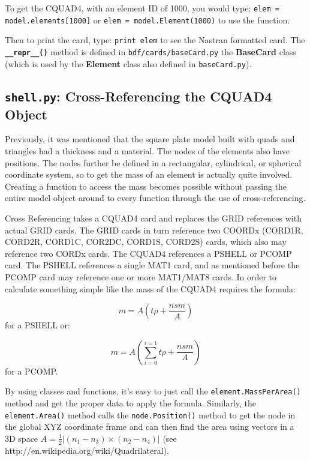      To get the CQUAD4, with an element ID of 1000, you would type:
       {\tt elem = model.elements[1000]} or
       {\tt elem = model.Element(1000)} to use the function.
     
     Then to print the card, type:
       {\tt print elem}
     to see the Nastran formatted card.  The {\bf \tt \_\_repr\_\_()} method is defined in {\tt bdf/cards/baseCard.py} the {\bf BaseCard} class (which is used by the {\bf Element} class also defined in {\tt baseCard.py}).

 \subsection{{\tt shell.py}: Cross-Referencing the CQUAD4 Object}
     Previously, it was mentioned that the square plate model built with quads and triangles had a thickness and a material.  The nodes of the elements also have positions.  The nodes further be defined in a rectangular, cylindrical, or spherical coordinate system, so to get the mass of an element is actually quite involved.  Creating a function to access the mass becomes possible without passing the entire model object around to every function through the use of cross-referencing.
     
     Cross Referencing takes a CQUAD4 card and replaces the GRID references with actual GRID cards.  The GRID cards in turn reference two COORDx (CORD1R, CORD2R, CORD1C, COR2DC, CORD1S, CORD2S) cards, which also may reference two CORDx cards.  The CQUAD4 references a PSHELL or PCOMP card.  The PSHELL references a single MAT1 card, and as mentioned before the PCOMP card may reference one or more MAT1/MAT8 cards.  In order to calculate something simple like the mass of the CQUAD4 requires the formula:
     
     {\begin{equation} m=A ( t\rho + \frac{nsm}{A} ) \end{equation} } for a PSHELL or:

     {\begin{equation} m=A (\sum_{i=0}^{i=1}{t\rho} + \frac{nsm}{A} )  \end{equation} } for a PCOMP.
     

     By using classes and functions, it's easy to just call the {\tt element.MassPerArea()} method and get the proper data to apply the formula.  Similarly, the {\tt element.Area()} method calls the {\tt node.Position()} method to get the node in the global XYZ coordinate frame and can then find the area using vectors in a 3D space
     $ A=\frac{1}{2} | (n_1-n_3) \times (n_2-n_4) | $ (see http://en.wikipedia.org/wiki/Quadrilateral).
 

